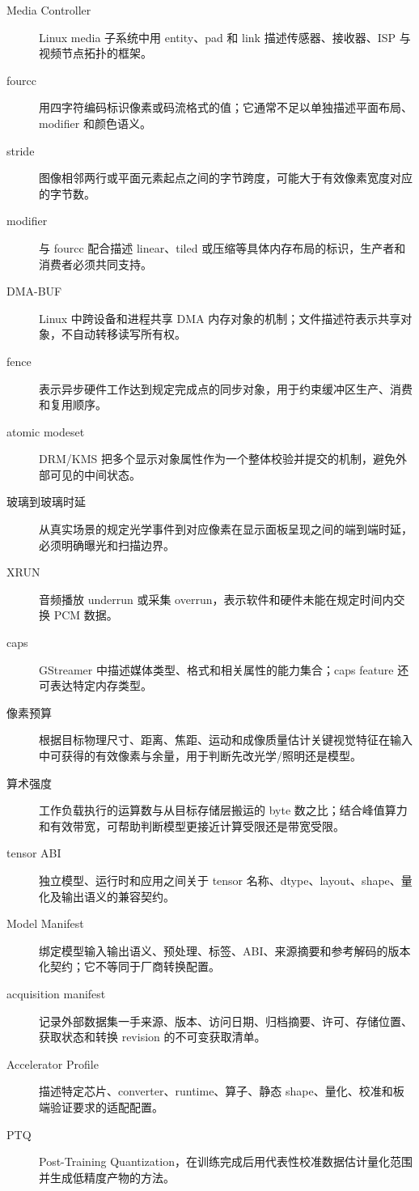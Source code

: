 \begin{description}
  \item[Media Controller] Linux media 子系统中用 entity、pad 和 link 描述传感器、接收器、ISP 与视频节点拓扑的框架。
  \item[fourcc] 用四字符编码标识像素或码流格式的值；它通常不足以单独描述平面布局、modifier 和颜色语义。
  \item[stride] 图像相邻两行或平面元素起点之间的字节跨度，可能大于有效像素宽度对应的字节数。
  \item[modifier] 与 fourcc 配合描述 linear、tiled 或压缩等具体内存布局的标识，生产者和消费者必须共同支持。
  \item[DMA-BUF] Linux 中跨设备和进程共享 DMA 内存对象的机制；文件描述符表示共享对象，不自动转移读写所有权。
  \item[fence] 表示异步硬件工作达到规定完成点的同步对象，用于约束缓冲区生产、消费和复用顺序。
  \item[atomic modeset] DRM/KMS 把多个显示对象属性作为一个整体校验并提交的机制，避免外部可见的中间状态。
  \item[玻璃到玻璃时延] 从真实场景的规定光学事件到对应像素在显示面板呈现之间的端到端时延，必须明确曝光和扫描边界。
  \item[XRUN] 音频播放 underrun 或采集 overrun，表示软件和硬件未能在规定时间内交换 PCM 数据。
  \item[caps] GStreamer 中描述媒体类型、格式和相关属性的能力集合；caps feature 还可表达特定内存类型。
  \item[像素预算] 根据目标物理尺寸、距离、焦距、运动和成像质量估计关键视觉特征在输入中可获得的有效像素与余量，用于判断先改光学/照明还是模型。
  \item[算术强度] 工作负载执行的运算数与从目标存储层搬运的 byte 数之比；结合峰值算力和有效带宽，可帮助判断模型更接近计算受限还是带宽受限。
  \item[tensor ABI] 独立模型、运行时和应用之间关于 tensor 名称、dtype、layout、shape、量化及输出语义的兼容契约。
  \item[Model Manifest] 绑定模型输入输出语义、预处理、标签、ABI、来源摘要和参考解码的版本化契约；它不等同于厂商转换配置。
  \item[acquisition manifest] 记录外部数据集一手来源、版本、访问日期、归档摘要、许可、存储位置、获取状态和转换 revision 的不可变获取清单。
  \item[Accelerator Profile] 描述特定芯片、converter、runtime、算子、静态 shape、量化、校准和板端验证要求的适配配置。
  \item[PTQ] Post-Training Quantization，在训练完成后用代表性校准数据估计量化范围并生成低精度产物的方法。

\end{description}
